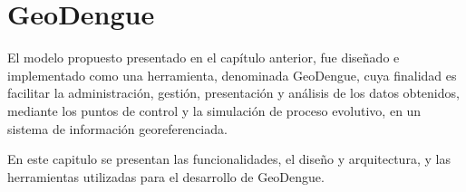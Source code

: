 \chapter{GeoDengue}
El modelo propuesto presentado en el capítulo anterior, fue diseñado e implementado como una
herramienta, denominada GeoDengue, cuya finalidad es facilitar la administración, gestión,
presentación y análisis de los datos obtenidos, mediante los puntos de control y la simulación de
proceso evolutivo, en un sistema de información georeferenciada.

En este capitulo se presentan las funcionalidades, el diseño y arquitectura, y las herramientas utilizadas para el desarrollo de GeoDengue.

%




%


